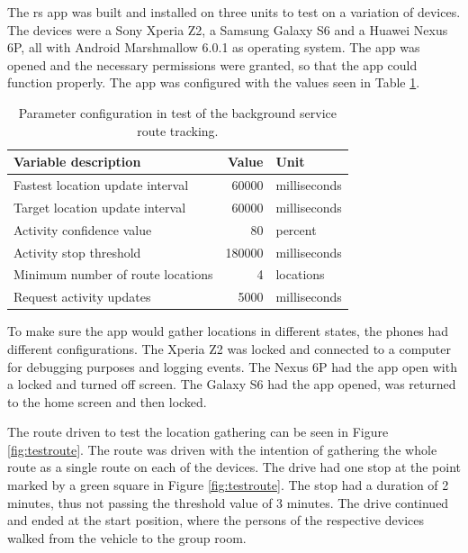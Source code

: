 The \gls{rs} app was built and installed on three units to test on a variation of devices.
The devices were a Sony Xperia Z2, a Samsung Galaxy S6 and a Huawei Nexus 6P, all with Android Marshmallow 6.0.1 as operating system.
The app was opened and the necessary permissions were granted, so that the app could function properly.
The app was configured with the values seen in Table \ref{tab:appconfig}.

\begin{table}[!ht]
	\centering
	\begin{tabular}{l r l}
		Variable description & Value & Unit\\
		\hline
		Fastest location update interval & 60000 & milliseconds\\
		Target location update interval & 60000 & milliseconds\\ 
		Activity confidence value & 80 & percent\\
		Activity stop threshold & 180000 & milliseconds\\
		Minimum number of route locations & 4 & locations \\
		Request activity updates & 5000 & milliseconds\\ 
	\end{tabular}
	\caption{Parameter configuration in test of the background service route tracking.}
	\label{tab:appconfig}
\end{table}

To make sure the app would gather locations in different states, the phones had different configurations.
The Xperia Z2 was locked and connected to a computer for debugging purposes and logging events.
The Nexus 6P had the app open with a locked and turned off screen. 
The Galaxy S6 had the app opened, was returned to the home screen and then locked.

The route driven to test the location gathering can be seen in Figure \ref{fig:testroute}.
The route was driven with the intention of gathering the whole route as a single route on each of the devices.
The drive had one stop at the point marked by a green square in Figure \ref{fig:testroute}.
The stop had a duration of 2 minutes, thus not passing the threshold value of 3 minutes.
The drive continued and ended at the start position, where the persons of the respective devices walked from the vehicle to the group room.

